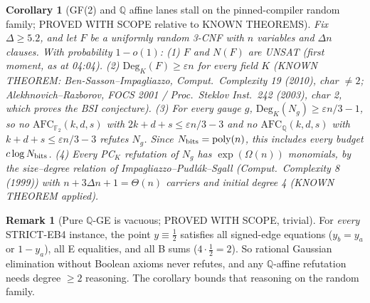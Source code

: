 \documentclass[11pt]{article}
\newtheorem{corollary}[theorem]{Corollary}
\theoremstyle{definition}
\newtheorem{remark}[theorem]{Remark}
\newcommand{\F}{\mathbb{F}_2}
\newcommand{\Deg}{\mathrm{Deg}}
\begin{document}
\begin{corollary}[GF(2) and $\mathbb Q$ affine lanes stall on the pinned-compiler random family; PROVED WITH SCOPE relative to KNOWN THEOREMS]\label{cor:stall}
Fix $\Delta\ge5.2$, and let $F$ be a uniformly random 3-CNF with $n$ variables and $\Delta n$ clauses. With probability $1-o(1)$:
(1) $F$ and $N(F)$ are UNSAT (first moment, as at 04:04).
(2) $\Deg_K(F)\ge\varepsilon n$ for every field $K$ (KNOWN THEOREM: Ben-Sasson--Impagliazzo, Comput.\ Complexity 19 (2010), char $\neq2$; Alekhnovich--Razborov, FOCS 2001 / Proc.\ Steklov Inst.\ 242 (2003), char 2, which proves the BSI conjecture).
(3) For every gauge $g$, $\Deg_K(N_g)\ge\varepsilon n/3-1$, so no $\mathrm{AFC}_{\F}(k,d,s)$ with $2k+d+s\le\varepsilon n/3-3$ and no $\mathrm{AFC}_{\mathbb Q}(k,d,s)$ with $k+d+s\le\varepsilon n/3-3$ refutes $N_g$. Since $N_{\rm bits}=\mathrm{poly}(n)$, this includes every budget $c\log N_{\rm bits}$.
(4) Every PC$_K$ refutation of $N_g$ has $\exp(\Omega(n))$ monomials, by the size--degree relation of Impagliazzo--Pudl\'ak--Sgall (Comput.\ Complexity 8 (1999)) with $n+3\Delta n+1=\Theta(n)$ carriers and initial degree 4 (KNOWN THEOREM applied).
\end{corollary}

\begin{remark}[Pure $\mathbb Q$-GE is vacuous; PROVED WITH SCOPE, trivial]
For \emph{every} STRICT-EB4 instance, the point $y\equiv\tfrac12$ satisfies all signed-edge equations ($y_b=y_a$ or $1-y_a$), all E equalities, and all B sums ($4\cdot\tfrac12=2$). So rational Gaussian elimination without Boolean axioms never refutes, and any $\mathbb Q$-affine refutation needs degree $\ge2$ reasoning. The corollary bounds that reasoning on the random family.
\end{remark}
\end{document}
